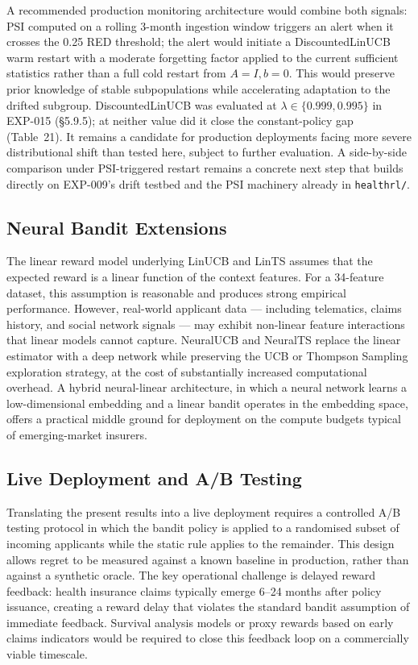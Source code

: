 A recommended production monitoring architecture would combine both signals: PSI computed on a rolling 3-month ingestion window triggers an alert when it crosses the 0.25 RED threshold; the alert would initiate a DiscountedLinUCB warm restart with a moderate forgetting factor applied to the current sufficient statistics rather than a full cold restart from \(A = I, b = 0\). This would preserve prior knowledge of stable subpopulations while accelerating adaptation to the drifted subgroup. DiscountedLinUCB was evaluated at \(\lambda \in \{0.999, 0.995\}\) in EXP-015 (§5.9.5); at neither value did it close the constant-policy gap (Table~21). It remains a candidate for production deployments facing more severe distributional shift than tested here, subject to further evaluation. A side-by-side comparison under PSI-triggered restart remains a concrete next step that builds directly on EXP-009's drift testbed and the PSI machinery already in \texttt{healthrl/}.

\subsection{Neural Bandit Extensions}\label{neural-bandit-extensions}

The linear reward model underlying LinUCB and LinTS assumes that the expected reward is a linear function of the context features. For a 34-feature dataset, this assumption is reasonable and produces strong empirical performance. However, real-world applicant data --- including telematics, claims history, and social network signals --- may exhibit non-linear feature interactions that linear models cannot capture. NeuralUCB and NeuralTS replace the linear estimator with a deep network while preserving the UCB or Thompson Sampling exploration strategy, at the cost of substantially increased computational overhead. A hybrid neural-linear architecture, in which a neural network learns a low-dimensional embedding and a linear bandit operates in the embedding space, offers a practical middle ground for deployment on the compute budgets typical of emerging-market insurers.

\subsection{Live Deployment and A/B Testing}\label{live-deployment-and-ab-testing}

Translating the present results into a live deployment requires a controlled A/B testing protocol in which the bandit policy is applied to a randomised subset of incoming applicants while the static rule applies to the remainder. This design allows regret to be measured against a known baseline in production, rather than against a synthetic oracle. The key operational challenge is delayed reward feedback: health insurance claims typically emerge 6--24 months after policy issuance, creating a reward delay that violates the standard bandit assumption of immediate feedback. Survival analysis models or proxy rewards based on early claims indicators would be required to close this feedback loop on a commercially viable timescale.

